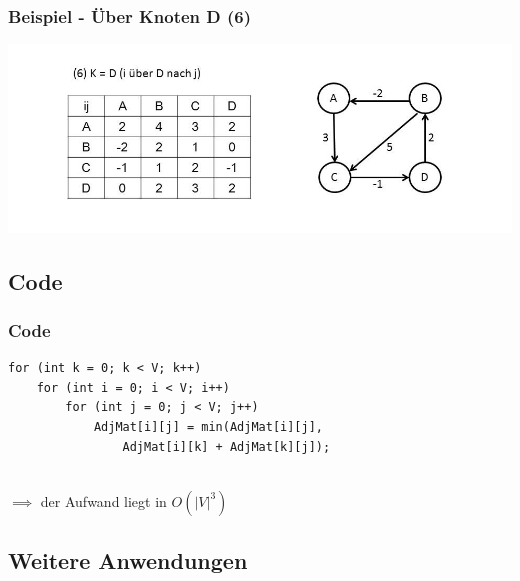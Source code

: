 
\begin{frame}
\frametitle{Beispiel - Über Knoten D (6)}

\includegraphics[width=\linewidth]{floyd_warshall_graphs/graph10.JPG}

\end{frame}


\subsection{Code}

\begin{frame}[fragile] %
\frametitle{Code}

\begin{lstlisting}
for (int k = 0; k < V; k++)
    for (int i = 0; i < V; i++)
        for (int j = 0; j < V; j++)
            AdjMat[i][j] = min(AdjMat[i][j],
                AdjMat[i][k] + AdjMat[k][j]);
\end{lstlisting}

~\\$\implies$ der Aufwand liegt in $O(|V|^3)$

\end{frame}


\subsection{Weitere Anwendungen} 

